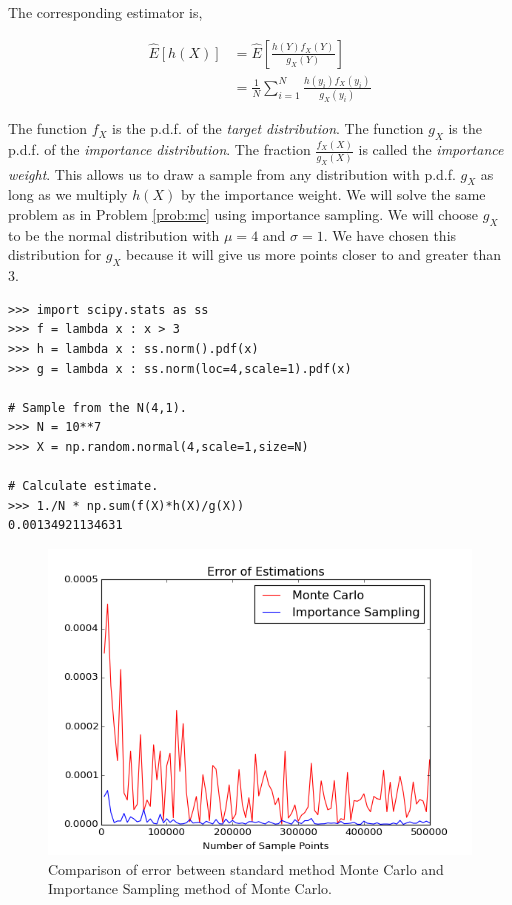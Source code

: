 The corresponding estimator is,

\begin{equation*}
\begin{split}
\widehat{E}[h(X)] & = \widehat{E}\left [ \frac{h(Y)f_X(Y)}{g_X(Y)}\right ] \\
& = \frac{1}{N}\sum_{i = 1}^{N}\frac{h(y_i)f_X(y_i)}{g_X(y_i)}
\end{split}
\end{equation*}

The function $f_X$ is the p.d.f. of the \emph{target distribution}. The function $g_X$ is the p.d.f. of the \emph{importance distribution}. The fraction $\frac{f_X(X)}{g_X(X)}$ is called the \emph{importance weight}. This allows us to draw a sample from any distribution with p.d.f. $g_X$ as long as we multiply $h(X)$ by the importance weight. We will solve the same problem as in Problem \ref{prob:mc} using importance sampling. We will choose $g_X$ to be the normal distribution with $\mu = 4$ and $\sigma = 1$. We have chosen this distribution for $g_X$ because it will give us more points closer to and greater than 3.

\begin{lstlisting}
>>> import scipy.stats as ss
>>> f = lambda x : x > 3
>>> h = lambda x : ss.norm().pdf(x)
>>> g = lambda x : ss.norm(loc=4,scale=1).pdf(x)

# Sample from the N(4,1).
>>> N = 10**7
>>> X = np.random.normal(4,scale=1,size=N)

# Calculate estimate.
>>> 1./N * np.sum(f(X)*h(X)/g(X))
0.00134921134631
\end{lstlisting}

\begin{figure}[H]
\includegraphics[width=\textwidth]{MCvsIS.png}
\caption{Comparison of error between standard method Monte Carlo and Importance Sampling method of Monte Carlo.}
\label{fig:compare}
\end{figure}

